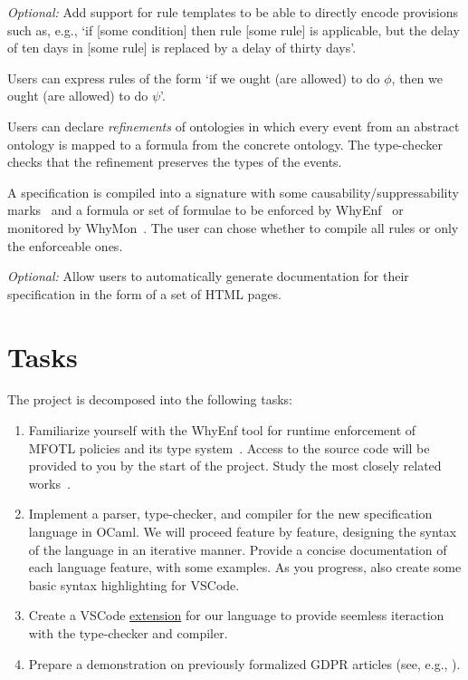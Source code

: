 \documentclass{proposal}
\begin{document}
\begin{description}
\emph{Optional:} Add support for rule templates to be able to directly encode provisions such as, e.g., `if [some condition] then rule [some rule] is applicable, but the delay of ten days in [some rule] is replaced by a delay of thirty days'.
\item[Explicit reasoning about obligations / permissions.] Users can express rules of the form `if we ought (are allowed) to do $\phi$, then we ought (are allowed) to do $\psi$'.

\item[Support for refinement.] Users can declare \emph{refinements} of ontologies in which every event from an abstract ontology is mapped to a formula from the concrete ontology. The type-checker checks that the refinement preserves the types of the events.

\item[Compilation.] A specification is compiled into a signature with some causability/suppressability marks~\cite{Hublet2024} and a formula or set of formulae to be enforced by WhyEnf~\cite{Hublet2024} or monitored by WhyMon~\cite{Lima2023}.  The user can chose whether to compile all rules or only the enforceable ones. 

{\color{green} \emph{Optional:} Allow users to automatically generate documentation for their specification in the form of a set of HTML pages.}
\end{description}

\section{Tasks}\label{sec:tasks}

The project is decomposed into the following tasks:

\begin{enumerate}
\item Familiarize yourself with the WhyEnf tool for runtime enforcement of MFOTL policies and its type system~\cite{Hublet2024}. Access to the source code will be provided to you by the start of the project. Study the most closely related works~\cite{Robaldo2020,Merigoux2021,Hublet2023}.
\item Implement a parser, type-checker, and compiler for the new specification language in OCaml. We will proceed feature by feature, designing the syntax of the language in an iterative manner. Provide a concise documentation of each language feature, with some examples. As you progress, also create some basic syntax highlighting for VSCode.
\item Create a VSCode \href{https://code.visualstudio.com/api/language-extensions/overview}{extension} for our language to provide seemless iteraction with the type-checker and compiler.
\item Prepare a demonstration on previously formalized GDPR articles (see, e.g., \cite{Kvamme2024}).
\end{enumerate}
\end{document}
